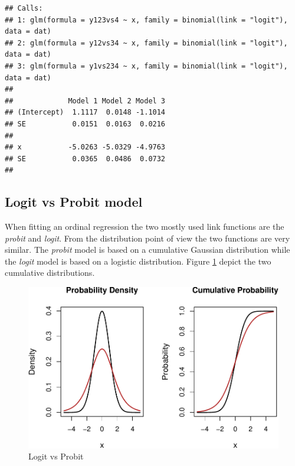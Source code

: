 \documentclass[
  man,floatsintext]{apa6}
\begin{document}
\begin{verbatim}
## Calls:
## 1: glm(formula = y123vs4 ~ x, family = binomial(link = "logit"), data = dat)
## 2: glm(formula = y12vs34 ~ x, family = binomial(link = "logit"), data = dat)
## 3: glm(formula = y1vs234 ~ x, family = binomial(link = "logit"), data = dat)
## 
##             Model 1 Model 2 Model 3
## (Intercept)  1.1117  0.0148 -1.1014
## SE           0.0151  0.0163  0.0216
##                                    
## x           -5.0263 -5.0329 -4.9763
## SE           0.0365  0.0486  0.0732
## 
\end{verbatim}

\subsection{Logit vs Probit model}\label{logit-vs-probit-model}

When fitting an ordinal regression the two mostly used link functions are the \emph{probit} and \emph{logit}. From the distribution point of view the two functions are very similar. The \emph{probit} model is based on a cumulative Gaussian distribution while the \emph{logit} model is based on a logistic distribution. Figure \ref{fig:logit-vs-probit} depict the two cumulative distributions.

\begin{figure}

{\centering \includegraphics{paper-new_files/figure-latex/logit-vs-probit-1} 

}

\caption{Logit vs Probit}\label{fig:logit-vs-probit}
\end{figure}
\end{document}
